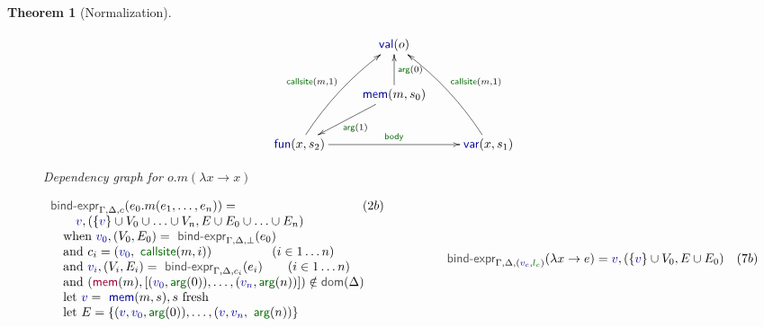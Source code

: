 \documentclass[acmsmall,anonymous,fleqn]{acmart}\settopmatter{printfolios=false,printccs=false,printacmref=false}
\newcounter{thc}
\theoremstyle{plain}
\newtheorem{theorem}[thc]{Theorem}
\theoremstyle{definition}
\newcommand{\ident}[1]{\textnormal{\textcolor{idclr}{\sffamily #1}}}
\newcommand{\bndclr}[1]{\textcolor{kvdclr}{#1}}
\newcommand{\blblclr}[1]{\textcolor{numclr}{#1}}
\newcommand{\bnd}[1]{\textnormal{\textcolor{kvdclr}{\sffamily #1}}}
\newcommand{\bknd}[1]{\textnormal{\textcolor{prepclr}{\sffamily #1}}}
\newcommand{\blbl}[1]{\textnormal{\textcolor{numclr}{\sffamily #1}}}
\begin{document}
\begin{theorem}[Normalization]
\begin{figure}[!b]
\vspace{-0.5em}
\begin{equation*}
\xymatrix{
&\bnd{val}(o)\\
&\bnd{mem}(m, s_0) \ar[u]_{\blbl{arg}(0)} \ar[dl]^{\blbl{arg}(1)} \\
\bnd{fun}(x, s_2) \ar@/^/[uur]^{\blbl{callsite}(m, 1)} \ar[rr]^{\blbl{body}} && \bnd{var}(x, s_1) \ar@/_/[uul]_{\blbl{callsite}(m, 1)}
}
\end{equation*}
\caption{Dependency graph for $o.m(\lambda x\rightarrow x)$}
\label{fig:graph-func}
\end{figure}


\begin{figure}[t]
\vspace{-0.5em}
\begin{equation*}
\begin{array}{ll}
\ident{bind-expr}_{\Gamma, \Delta, c}(e_0.m(e_1, \ldots, e_n)) = &(2b)\\
\qquad \bndclr{v}, (\{\bndclr{v}\} \cup V_0 \cup \ldots \cup V_n, E \cup E_0 \cup \ldots \cup E_n)\\
\quad \textnormal{when}~\bndclr{v_0}, (V_0, E_0) = \ident{bind-expr}_{\Gamma, \Delta, \bot}(e_0)\\
\quad \textnormal{and}~c_i = (\bndclr{v_0}, \blbl{callsite}(m,i))\hspace{4.8em} (i \in 1\ldots n)\\
\quad \textnormal{and}~\bndclr{v_i}, (V_i, E_i) = \ident{bind-expr}_{\Gamma, \Delta, c_i}(e_i)\qquad (i\in 1\ldots n)\\
\quad \textnormal{and}~(\bknd{mem}(m),[(\bndclr{v_0}, \blbl{arg}(0)), \ldots, (\bndclr{v_n}, \blbl{arg}(n))]) \notin \ident{dom}(\Delta)\hspace{-200em}.\\
\quad \textnormal{let}~\bndclr{v} = \bnd{mem}(m, s), s~\textnormal{fresh}\\
\quad \textnormal{let}~E = \{ (\bndclr{v}, \bndclr{v_0}, \blbl{arg}(0)), \ldots, (\bndclr{v},\bndclr{v_n}, \blbl{arg}(n)) \}
\end{array}
\qquad\qquad
\begin{array}{ll}
\ident{bind-expr}_{\Gamma, \Delta, (\bndclr{v_c}, \blblclr{l_c} )}(\lambda x \rightarrow e) = \bndclr{v}, (\{\bndclr{v}\} \cup V_0, E \cup E_0)&(7b)\\

\end{array}
\end{equation*}
\end{figure}
\end{theorem}
\end{document}
